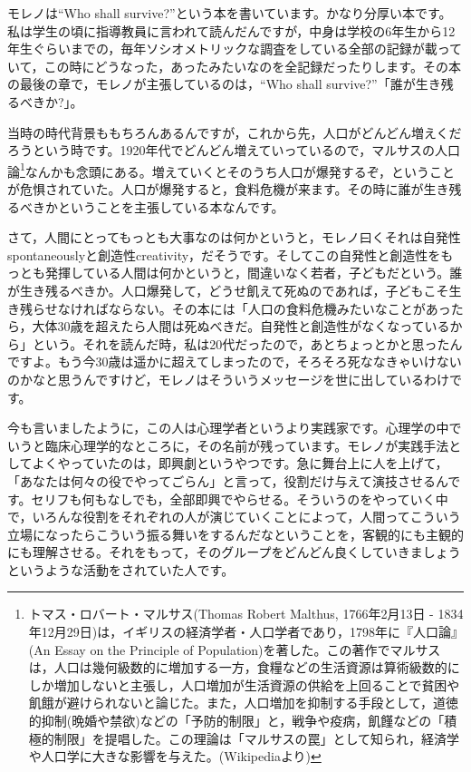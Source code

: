 \documentclass{ltjsbook}
\begin{document}
モレノは``Who shall survive?''という本\parencite{moreno1934who}を書いています。かなり分厚い本です。私は学生の頃に指導教員に言われて読んだんですが，中身は学校の6年生から12年生ぐらいまでの，毎年ソシオメトリックな調査をしている全部の記録が載っていて，この時にどうなった，あったみたいなのを全記録だったりします。その本の最後の章で，モレノが主張しているのは，``Who shall survive?''「誰が生き残るべきか?」。

当時の時代背景ももちろんあるんですが，これから先，人口がどんどん増えくだろうという時です。1920年代でどんどん増えていっているので，マルサスの人口論\footnote{トマス・ロバート・マルサス(Thomas Robert Malthus, 1766年2月13日 - 1834年12月29日)は，イギリスの経済学者・人口学者であり，1798年に『人口論』(An Essay on the Principle of Population)を著した。この著作でマルサスは，人口は幾何級数的に増加する一方，食糧などの生活資源は算術級数的にしか増加しないと主張し，人口増加が生活資源の供給を上回ることで貧困や飢餓が避けられないと論じた。また，人口増加を抑制する手段として，道徳的抑制(晩婚や禁欲)などの「予防的制限」と，戦争や疫病，飢饉などの「積極的制限」を提唱した。この理論は「マルサスの罠」として知られ，経済学や人口学に大きな影響を与えた。(Wikipediaより)}なんかも念頭にある。増えていくとそのうち人口が爆発するぞ，ということが危惧されていた。人口が爆発すると，食料危機が来ます。その時に誰が生き残るべきかということを主張している本なんです。

さて，人間にとってもっとも大事なのは何かというと，モレノ曰くそれは自発性spontaneouslyと創造性creativity，だそうです。そしてこの自発性と創造性をもっとも発揮している人間は何かというと，間違いなく若者，子どもだという。誰が生き残るべきか。人口爆発して，どうせ飢えて死ぬのであれば，子どもこそ生き残らせなければならない。その本には「人口の食料危機みたいなことがあったら，大体30歳を超えたら人間は死ぬべきだ。自発性と創造性がなくなっているから」という。それを読んだ時，私は20代だったので，あとちょっとかと思ったんですよ。もう今30歳は遥かに超えてしまったので，そろそろ死ななきゃいけないのかなと思うんですけど，モレノはそういうメッセージを世に出しているわけです。

今も言いましたように，この人は心理学者というより実践家です。心理学の中でいうと臨床心理学的なところに，その名前が残っています。モレノが実践手法としてよくやっていたのは，即興劇というやつです。急に舞台上に人を上げて，「あなたは何々の役でやってごらん」と言って，役割だけ与えて演技させるんです。セリフも何もなしでも，全部即興でやらせる。そういうのをやっていく中で，いろんな役割をそれぞれの人が演じていくことによって，人間ってこういう立場になったらこういう振る舞いをするんだなということを，客観的にも主観的にも理解させる。それをもって，そのグループをどんどん良くしていきましょうというような活動をされていた人です。
\end{document}
